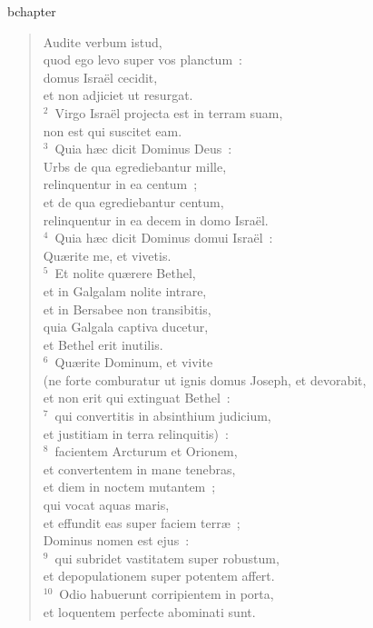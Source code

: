 bchapter\begin{verse}\vspace{-19pt}Audite verbum istud,\\ quod ego levo super vos planctum~:\\ domus Isra\"el cecidit,\\ et non adjiciet ut resurgat.\\
${}^{2}$~Virgo Isra\"el projecta est in terram suam,\\ non est qui suscitet eam.\\
${}^{3}$~Quia h\ae c dicit Dominus Deus~:\\ Urbs de qua egrediebantur mille,\\ relinquentur in ea centum~;\\ et de qua egrediebantur centum,\\ relinquentur in ea decem in domo Isra\"el.\\
${}^{4}$~Quia h\ae c dicit Dominus domui Isra\"el~:\\ Qu\ae rite me, et vivetis.\\
${}^{5}$~Et nolite qu\ae rere Bethel,\\ et in Galgalam nolite intrare,\\ et in Bersabee non transibitis,\\ quia Galgala captiva ducetur,\\ et Bethel erit inutilis.\\
${}^{6}$~Qu\ae rite Dominum, et vivite\\ (ne forte comburatur ut ignis domus Joseph, et devorabit,\\ et non erit qui extinguat Bethel~:\\
${}^{7}$~qui convertitis in absinthium judicium,\\ et justitiam in terra relinquitis)~:\\
${}^{8}$~facientem Arcturum et Orionem,\\ et convertentem in mane tenebras,\\ et diem in noctem mutantem~;\\ qui vocat aquas maris,\\ et effundit eas super faciem terr\ae~;\\ Dominus nomen est ejus~:\\
${}^{9}$~qui subridet vastitatem super robustum,\\ et depopulationem super potentem affert.\\
${}^{10}$~Odio habuerunt corripientem in porta,\\ et loquentem perfecte abominati sunt.\\

\end{verse}
